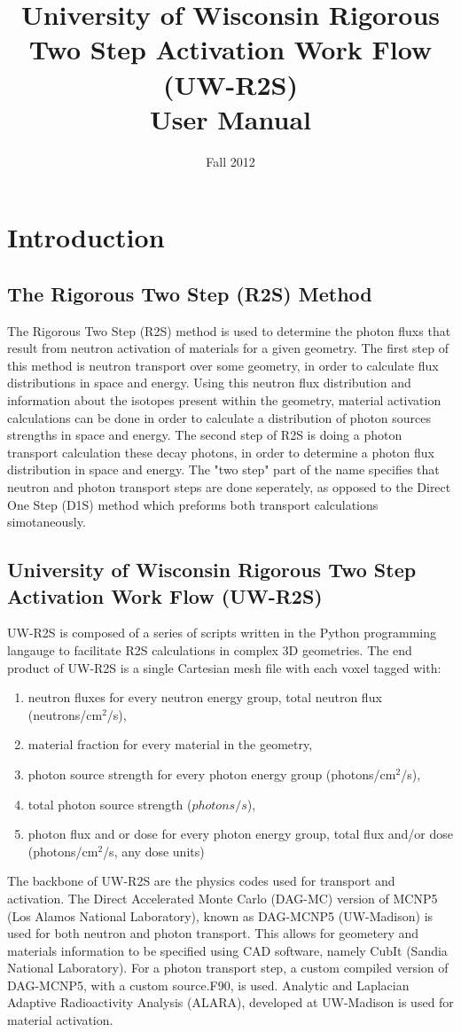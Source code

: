 \documentclass{article}
\title{University of Wisconsin Rigorous Two Step Activation Work Flow (UW-R2S) \\ User Manual}
\date{Fall 2012}
\begin{document}
\maketitle

\section{Introduction}
\subsection{The Rigorous Two Step (R2S) Method}
The Rigorous Two Step (R2S) method is used to determine the photon fluxs that result from neutron activation of materials for a given geometry. The first step of this method is neutron transport over some geometry, in order to calculate flux distributions in space and energy. Using this neutron flux distribution and information about the isotopes present within the geometry, material activation calculations can be done in order to calculate a distribution of photon sources strengths in space and energy. The second step of R2S is doing a photon transport calculation these decay photons, in order to determine a photon flux distribution in space and energy. The "two step" part of the name specifies that neutron and photon transport steps are done seperately, as opposed to the Direct One Step (D1S) method which preforms both transport calculations simotaneously. 

\subsection{University of Wisconsin Rigorous Two Step Activation Work Flow (UW-R2S)}
UW-R2S is composed of a series of scripts written in the Python programming langauge to facilitate R2S calculations in complex 3D geometries. The end product of UW-R2S is a single Cartesian mesh file with each voxel tagged with:
\begin{enumerate}
\item{neutron fluxes for every neutron energy group, total neutron flux (neutrons/cm$^2$/s)},
\item{material fraction for every material in the geometry},
\item{photon source strength for every photon energy group (photons/cm$^2$/s)},
\item{total photon source strength ($photons/s$)},
\item{photon flux and or dose for every photon energy group, total flux and/or dose (photons/cm$^2$/s, any dose units)}
\end{enumerate}
The backbone of UW-R2S are the physics codes used for transport and activation. The Direct Accelerated Monte Carlo (DAG-MC) version of MCNP5 (Los Alamos National Laboratory), known as DAG-MCNP5 (UW-Madison) is used for both neutron and photon transport. This allows for geometery and materials information to be specified using CAD software, namely CubIt (Sandia National Laboratory). For a photon transport step, a custom compiled version of DAG-MCNP5, with a custom source.F90, is used. Analytic and Laplacian Adaptive Radioactivity Analysis (ALARA), developed at UW-Madison is used for material activation.
\end{document}
